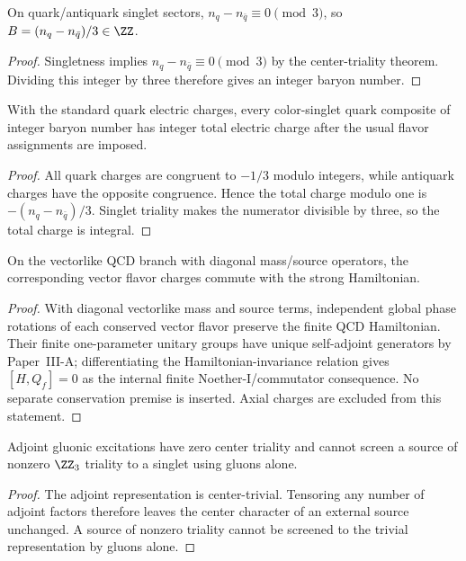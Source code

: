 \documentclass[12pt,a4paper]{article}
\begin{document}
\begin{corollary}
\label{p10:cor:integer-baryon-number}
On quark/antiquark singlet sectors, \(n_q-n_{\bar q}\equiv0\pmod3\), so \(B=(n_q-n_{\bar q})/3\in\ZZ\).
\end{corollary}
\begin{proof}
Singletness implies $n_q-n_{\bar q}\equiv0\pmod3$ by the center-triality theorem.  Dividing this integer by three therefore gives an integer baryon number.
\end{proof}

\begin{theorem}
\label{p10:thm:integer-hadronic-electric-charge}
With the standard quark electric charges, every color-singlet quark composite of integer baryon number has integer total electric charge after the usual flavor assignments are imposed.
\end{theorem}
\begin{proof}
All quark charges are congruent to $-1/3$ modulo integers, while antiquark charges have the opposite congruence.  Hence the total charge modulo one is $-(n_q-n_{\bar q})/3$.  Singlet triality makes the numerator divisible by three, so the total charge is integral.
\end{proof}

\begin{theorem}
\label{p10:thm:vector-flavor-charge-conservation}
On the vectorlike QCD branch with diagonal mass/source operators, the corresponding vector flavor charges commute with the strong Hamiltonian.
\end{theorem}
\begin{proof}
With diagonal vectorlike mass and source terms, independent global phase rotations of each conserved vector flavor preserve the finite QCD Hamiltonian.  Their finite one-parameter unitary groups have unique self-adjoint generators by Paper~III-A; differentiating the Hamiltonian-invariance relation gives $[H,Q_f]=0$ as the internal finite Noether-I/commutator consequence.  No separate conservation premise is inserted.  Axial charges are excluded from this statement.
\end{proof}

\begin{theorem}
\label{p10:thm:pure-glue-center-obstruction-screening}
Adjoint gluonic excitations have zero center triality and cannot screen a source of nonzero \(\ZZ_3\) triality to a singlet using gluons alone.
\end{theorem}
\begin{proof}
The adjoint representation is center-trivial.  Tensoring any number of adjoint factors therefore leaves the center character of an external source unchanged.  A source of nonzero triality cannot be screened to the trivial representation by gluons alone.
\end{proof}
\end{document}
